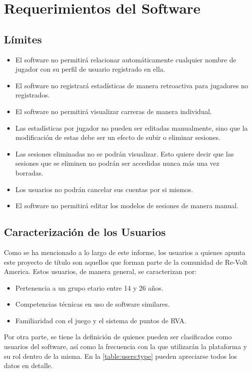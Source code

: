 \chapter{Requerimientos del Software}

\section{Límites}

\begin{itemize}
	\item El software no permitirá relacionar automáticamente cualquier nombre de jugador con su perfil de usuario registrado en ella.
	\item El software no registrará estadísticas de manera retroactiva para jugadores no registrados.
	\item El software no permitirá visualizar carreras de manera individual.
	\item Las estadísticas por jugador no pueden ser editadas manualmente, sino que la modificación de estas debe ser un efecto de subir o eliminar sesiones.
	\item Las sesiones eliminadas no se podrán visualizar. Esto quiere decir que las sesiones que se eliminen no podrán ser accedidas nunca más una vez borradas.
	\item Los usuarios no podrán cancelar sus cuentas por si mismos.
	\item El software no permitirá editar los modelos de sesiones de manera manual.
\end{itemize}

\section{Caracterización de los Usuarios}
Como se ha mencionado a lo largo de este informe, los usuarios a quienes apunta este proyecto de título son aquellos que forman parte de la comunidad de Re-Volt America. Estos usuarios, de manera general, se caracterizan por:

\begin{itemize}
	\item Pertenencia a un grupo etario entre 14 y 26 años.
	\item Competencias técnicas en uso de software similares.
	\item Familiaridad con el juego y el sistema  de puntos de RVA.
\end{itemize}

Por otra parte, se tiene la definición de quienes pueden ser clasificados como usuarios del software, así como la frecuencia con la que utilizarán la plataforma y su rol dentro de la misma. En la \autoref{table:users:type} pueden apreciarse todos los datos en detalle.

